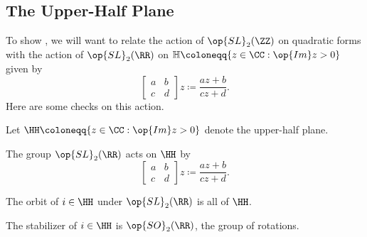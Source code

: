 \documentclass[../notes.tex]{subfiles}
\begin{document}
\subsection{The Upper-Half Plane}
To show , we will want to relate the action of $\op{SL}_2(\ZZ)$ on quadratic forms with the action of $\op{SL}_2(\RR)$ on $\mathbb H\coloneqq\{z\in\CC:\op{Im}z>0\}$ given by
\[\begin{bmatrix}
	a & b \\
	c & d
\end{bmatrix}z\coloneqq\frac{az+b}{cz+d}.\]
Here are some checks on this action.
\begin{lemma} \label{lem:basic-upper-half-plane}
	Let $\HH\coloneqq\{z\in\CC:\op{Im}z>0\}$ denote the upper-half plane.
	\begin{listalph}
		\item The group $\op{SL}_2(\RR)$ acts on $\HH$ by
		\[\begin{bmatrix}
			a & b \\
			c & d
		\end{bmatrix}z\coloneqq\frac{az+b}{cz+d}.\]
		\item The orbit of $i\in\HH$ under $\op{SL}_2(\RR)$ is all of $\HH$.
		\item The stabilizer of $i\in\HH$ is $\op{SO}_2(\RR)$, the group of rotations.
	\end{listalph}
\end{lemma}
\end{document}
